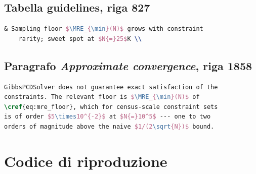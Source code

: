 \documentclass[11pt,a4paper]{article}
\newcommand{\MRE}{\mathrm{MRE}}
\begin{document}
\subsection*{Tabella guidelines, riga 827}

\begin{lstlisting}[language=TeX]
  & Sampling floor $\MRE_{\min}(N)$ grows with constraint
    rarity; sweet spot at $N{=}25$K \\
\end{lstlisting}

\subsection*{Paragrafo \emph{Approximate convergence}, riga 1858}

\begin{lstlisting}[language=TeX]
GibbsPCDSolver does not guarantee exact satisfaction of the
constraints. The relevant floor is $\MRE_{\min}(N)$ of
\cref{eq:mre_floor}, which for census-scale constraint sets
is of order $5\times10^{-2}$ at $N{=}10^5$ --- one to two
orders of magnitude above the naive $1/(2\sqrt{N})$ bound.
\end{lstlisting}


\section{Codice di riproduzione}
\end{document}
